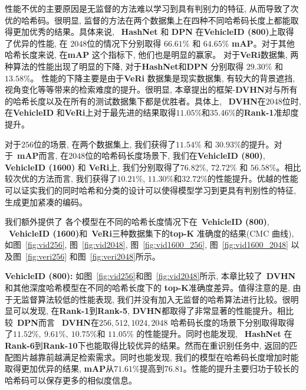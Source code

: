 性能不优的主要原因是无监督的方法难以学习到具有判别力的特征, 从而导致了次优的哈希码。很明显, 监督的方法在两个数据集上在四种不同哈希码长度上都能取得更加优秀的结果。具体来说, ~\textbf{HashNet} 和 \textbf{DPN} 在\textbf{VehicleID (800)}上取得了优异的性能, 在 $2048$位的情况下分别取得 $66.61 \%$ 和 $64.65 \%$ \textbf{mAP}。对于其他哈希长度来说, 在\textbf{mAP} 这个指标下, 他们也是明显的赢家。 对于\textbf{VeRi}数据集, 两种算法的性能出现了明显的下降, 对于\textbf{HashNet}和\textbf{DPN} 分别取得 $29.30\%$ 和$13.58\%$。 性能的下降主要是由于\textbf{VeRi} 数据集是现实数据集, 有较大的背景遮挡, 视角变化等等带来的检索难度的提升。很明显, 本章提出的框架-\textbf{DVHN}对与所有的哈希长度以及在所有的测试数据集下都是优胜者。具体上, ~\textbf{DVHN}在$2048$位时, 在\textbf{VehicleID} 和\textbf{VeRi}上对于最先进的结果取得$11.05\%$和$35.46 \%$的\textbf{Rank-1}准却度提升。



对于$256$位的场景, 在两个数据集上, 我们获得了$11.54 \%$ 和 $30.93 \%$的提升。对于~\textbf{mAP}而言, 在$2048$位的哈希码长度场景下, 我们在\textbf{VehicleID (800)}, \textbf{VehicleID (1600)} 和 \textbf{VeRi}上, 我们分别取得了$76.82 \%$, $72.72 \%$ 和 $56.58 \%$。相比较次优的方法而言, 我们获得了$10.21 \%$, $11.30 \%$和$32.72\%$的性能提升。优越的性能可以证实我们的同时哈希和分类的设计可以使得模型学习到更具有判别性的特征, 生成更加紧凑的编码。\par 
我们额外提供了 各个模型在不同的哈希长度情况下在~\textbf{VehicleID (800)}, ~\textbf{VehicleID (1600)}和~\textbf{VeRi}三种数据集下的\textbf{top-K} 准确度的结果(CMC 曲线), 如图~\ref{fig:vid256}, 图~\ref{fig:vid2048}, 图~\ref{fig:vid1600_256}, 图~\ref{fig:vid1600_2048} 以及图~\ref{fig:veri256} 和图~\ref{fig:veri2048}所示。 \par
\textbf{VehicleID (800):} 如图~\ref{fig:vid256}和图~\ref{fig:vid2048}所示, 本章比较了~\textbf{DVHN}和其他深度哈希模型在不同的哈希长度下的 \textbf{top-K}准确度差异。值得注意的是, 由于无监督算法较低的性能表现, 我们并没有加入无监督的哈希算法进行比较。很明显可以发现, 在\textbf{Rank-1}到\textbf{Rank-5}, \textbf{DVHN}都取得了非常显著的性能提升。相比较~\textbf{DPN}而言 ~\textbf{DVHN}在$256, 512, 1024, 2048$ 哈希码长度的场景下分别取得取得了$11.52\%,~9.61\%,~10.75\% $和 $11.05\%$ 的性能提升。同时也能发现, ~\textbf{HashNet} 在\textbf{Rank-6}到\textbf{Rank-10}下也能取得比较优异的结果。然而在重识别任务中, 返回的匹配图片越靠前越满足检索需求。同时也能发现, 我们的模型在哈希码长度增加时能取得更加优异的结果, \textbf{mAP}从$71.61\%$提高到$76.81$。性能的提升主要归功于较长的哈希码可以保存更多的相似度信息。 \par


